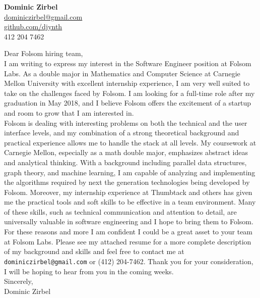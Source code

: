 \documentclass[letterpaper,10pt]{article}
\newcommand{\lb}{\vspace{14pt} \\}
\begin{document}
\thispagestyle{empty}

\begin{flushright}
    \textbf{\Large{Dominic Zirbel}} \\
    \href{mailto:dominiczirbel@gmail.com}{dominiczirbel@gmail.com} \\
    \href{https://github.com/djynth}{github.com/djynth} \\
    412 204 7462
\end{flushright}

\vspace{36pt}

Dear Folsom hiring team,
\lb
I am writing to express my interest in the Software Engineer position at Folsom Labs. As a double major in Mathematics and Computer Science at Carnegie Mellon University with excellent internship experience, I am very well suited to take on the challenges faced by Folsom. I am looking for a full-time role after my graduation in May 2018, and I believe Folsom offers the excitement of a startup and room to grow that I am interested in.
\lb
Folsom is dealing with interesting problems on both the technical and the user interface levels, and my combination of a strong theoretical background and practical experience allows me to handle the stack at all levels. My coursework at Carnegie Mellon, especially as a math double major, emphasizes abstract ideas and analytical thinking. With a background including parallel data structures, graph theory, and machine learning, I am capable of analyzing and implementing the algorithms required by next the generation technologies being developed by Folsom. Moreover, my internship experience at Thumbtack and others has given me the practical tools and soft skills to be effective in a team environment. Many of these skills, such as technical communication and attention to detail, are universally valuable in software engineering and I hope to bring them to Folsom.
\lb
For these reasons and more I am confident I could be a great asset to your team at Folsom Labs. Please see my attached resume for a more complete description of my background and skills and feel free to contact me at \texttt{dominiczirbel@gmail.com} or (412) 204-7462. Thank you for your consideration, I will be hoping to hear from you in the coming weeks.
\lb
Sincerely, \\
Dominic Zirbel
\end{document}
